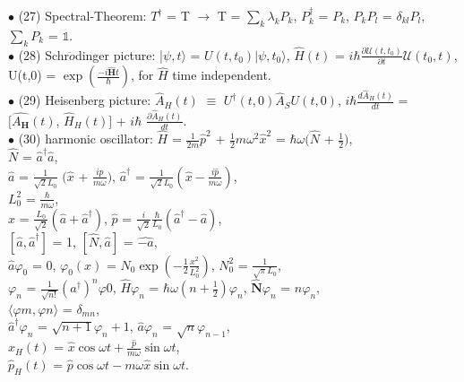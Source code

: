 \documentclass[10pt,fancy]{elegantbook}
\begin{document}
{$\bullet$ (27) Spectral-Theorem: $T^\dagger$ = T $\longrightarrow$ T = $\sum_k \lambda_k P_k$, $P^\dagger_k$ = $P_k$, $P_k P_l$ = $\delta_{kl} P_l$, $\sum_k P_k$ = $\mathbb 1$.  \\

$\bullet$ (28) Schr$\ddot{o}$dinger picture: |$\psi,t \rangle$ = $U(t,t_0) | \psi,t_0 \rangle$, $\hat{H}(t)$ = $i \hbar \frac{\partial \mathcal U(t, t_0)}{\partial t} \mathcal U(t_0,t)$,          
U(t,0) = $\exp( \frac{-i \hat{\mathbf H} t} {\hbar} )$, for $\hat{H}$ time independent. \\ 

$\bullet$ (29) Heisenberg picture: $\hat{A}_H(t)$ $\equiv$ $U^\dagger(t,0) \hat{A}_S U(t,0)$, $i \hbar \frac{d \hat{A}_H(t)}{dt}$ = $[\hat{A_\mathbf H}(t)$, $\hat{H}_H(t)]$ + $i \hbar$ $\frac{\partial \hat{A}_H(t)}{dt}$.  \\

$\bullet$ (30) harmonic oscillator: $\hat{H}$ = $\frac{1}{2m} \hat{p}^2$ + $\frac{1}{2}m \omega^2 \hat{x}^2$ = $ \hbar \omega(\hat{N}$ + $\frac{1}{2})$,  \\
$\hat{N}$ = $\hat{a}^\dagger \hat{a}$,  \\  
$\hat{a}$ = $\frac{1}{\sqrt{2}L_0}$ $(\hat{x}$ + $\frac{i \hat{p}}{m \omega})$, $\hat{a}^\dagger$ = $\frac{1}{\sqrt{2}L_0}(\hat{x} - \frac{i \hat{p}}{m \omega})$, \\ $L^2_0$ = $\frac{\hbar}{m \omega}$,  \\  
$\hat{x}$ = $\frac{L_0}{\sqrt{2}}(\hat{a} + \hat{a}^\dagger)$, $\hat{p}$ = $\frac{i}{\sqrt{2}} \frac{\hbar}{L_0}(\hat{a}^\dagger - \hat{a})$,  \\  
$[\hat{a}, \hat{a}^\dagger]$ = 1, $[\hat{N}, \hat{a}]$ = $\hat{-a}$,  \\  
$\hat{a} \varphi_0$ = 0, $\varphi_0(x)$ = $N_0 \exp(- \frac{1}{2} \frac{x^2}{L^2_0})$, $N^2_0$ = $\frac{1}{\sqrt{\pi}L_0}$,  \\  
$\varphi_n$ = $\frac{1}{\sqrt{n!}} (a^\dagger)^n \varphi0 $, $\hat{H} \varphi_n$ = $ \hbar \omega( n + \frac{1}{2}) \varphi_n$, $ \hat{\mathbf N} \varphi_n$ = $n \varphi_n$,  \\
$\langle \varphi{m}, \varphi{n} \rangle$ = $\delta_{mn}$, \\ 
$\hat{a}^\dagger \varphi_n$ = $\sqrt{n + 1} \varphi_n + 1$, $\hat{a} \varphi_n$ = $\sqrt{n} \varphi_{n - 1}$, \\  
$\hat{x}_H(t)$ = $\hat{x} \cos \omega{t} + \frac{\hat{p}}{m \omega} \sin{\omega{t}}$,  \\  
$\hat{p}_H(t)$ = $\hat{p} \cos \omega{t} - m \omega \hat{x} \sin \omega{t}$.  \\

}
\end{document}
